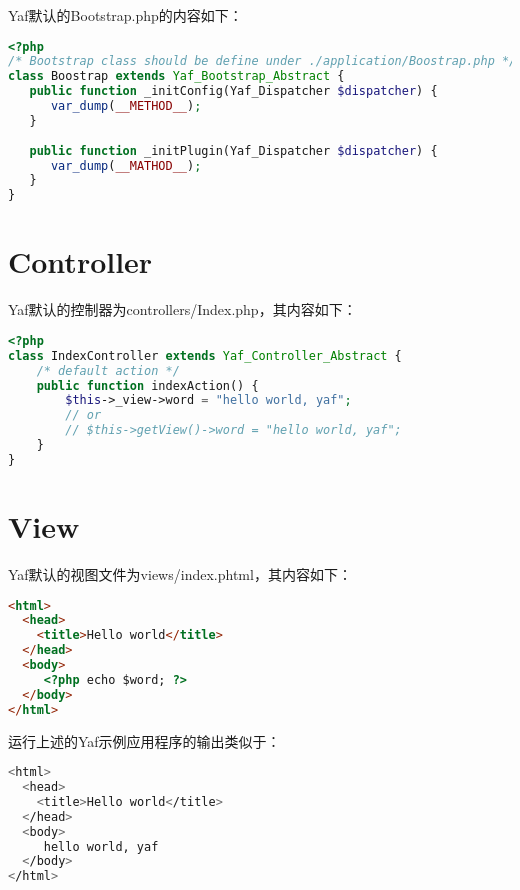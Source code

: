 Yaf默认的Bootstrap.php的内容如下：

\begin{lstlisting}[language=PHP]
<?php
/* Bootstrap class should be define under ./application/Boostrap.php */
class Boostrap extends Yaf_Bootstrap_Abstract {
   public function _initConfig(Yaf_Dispatcher $dispatcher) {
      var_dump(__METHOD__);
   }
   
   public function _initPlugin(Yaf_Dispatcher $dispatcher) {
      var_dump(__MATHOD__);
   }
}
\end{lstlisting}


\section{Controller}


Yaf默认的控制器为controllers/Index.php，其内容如下：

\begin{lstlisting}[language=PHP]
<?php
class IndexController extends Yaf_Controller_Abstract {
    /* default action */
    public function indexAction() {
        $this->_view->word = "hello world, yaf";
        // or
        // $this->getView()->word = "hello world, yaf";
    }
}
\end{lstlisting}


\section{View}


Yaf默认的视图文件为views/index.phtml，其内容如下：

\begin{lstlisting}[language=HTML]
<html>
  <head>
    <title>Hello world</title>
  </head>
  <body>
     <?php echo $word; ?>
  </body>
</html>
\end{lstlisting}

运行上述的Yaf示例应用程序的输出类似于：


\begin{lstlisting}[language=bash]
<html>
  <head>
    <title>Hello world</title>
  </head>
  <body>
     hello world, yaf
  </body>
</html>
\end{lstlisting}




\begin{lstlisting}[language=bash]

\end{lstlisting}